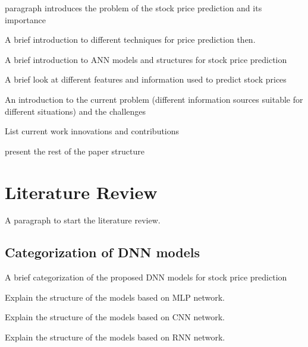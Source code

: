 \documentclass[12pt,journal,compsoc]{IEEEtran}
\begin{document}
% 
% 
% 
% 
 paragraph introduces the problem of the stock price prediction and its importance


A brief introduction to different techniques for price prediction then\cite{ahmadi2020comparative}.

A brief introduction to ANN models and structures for stock price prediction

A brief look at different features and information used to predict stock prices

An introduction to the current problem (different information sources suitable for different situations) and the challenges

List current work innovations and contributions

present the rest of the paper structure


\section{Literature Review}
A paragraph to start the literature review.

\subsection{Categorization of DNN models}
A brief categorization of the proposed DNN models for stock price prediction

Explain the structure of the models based on MLP network.

Explain the structure of the models based on CNN network.

Explain the structure of the models based on RNN network.
\end{document}

